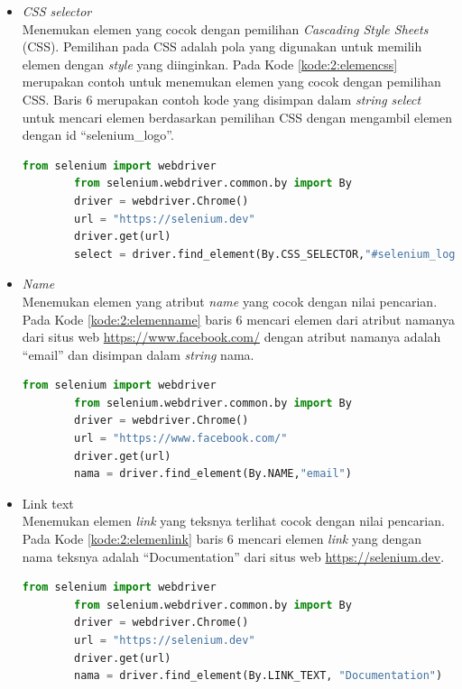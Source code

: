 \begin{itemize}
	\item \textit{CSS selector}\\
	Menemukan elemen yang cocok dengan pemilihan \textit{Cascading Style Sheets} (CSS). Pemilihan pada CSS adalah pola yang digunakan untuk memilih elemen dengan \textit{style} yang diinginkan. Pada Kode \ref{kode:2:elemencss} merupakan contoh untuk menemukan elemen yang cocok dengan pemilihan CSS. Baris 6 merupakan contoh kode yang disimpan dalam \textit{string} \textit{select} untuk mencari elemen berdasarkan pemilihan CSS dengan mengambil elemen dengan id ``selenium\_logo''.
	\begin{lstlisting}[language=python, caption=Contoh kode untuk menemukan elemen dengan \textit{CSS selector}, label=kode:2:elemencss]
		from selenium import webdriver
		from selenium.webdriver.common.by import By
		driver = webdriver.Chrome()
		url = "https://selenium.dev"
		driver.get(url)
		select = driver.find_element(By.CSS_SELECTOR,"#selenium_logo")
	\end{lstlisting}

	\item \textit{Name}\\
	Menemukan elemen yang atribut \textit{name} yang cocok dengan nilai pencarian. Pada Kode \ref{kode:2:elemenname} baris 6 mencari elemen dari atribut namanya dari situs web \url{https://www.facebook.com/} dengan atribut namanya adalah ``email'' dan disimpan dalam \textit{string} nama.
	\begin{lstlisting}[language=python, caption=Contoh kode untuk menemukan elemen dengan atribut nama, label=kode:2:elemenname]
		from selenium import webdriver
		from selenium.webdriver.common.by import By
		driver = webdriver.Chrome()
		url = "https://www.facebook.com/"
		driver.get(url)
		nama = driver.find_element(By.NAME,"email")
	\end{lstlisting}

	\item Link text\\
	Menemukan elemen \textit{link} yang teksnya terlihat cocok dengan nilai pencarian. Pada Kode \ref{kode:2:elemenlink} baris 6 mencari elemen \textit{link} yang dengan nama teksnya adalah ``Documentation'' dari situs web \url{https://selenium.dev}.
	\begin{lstlisting}[language=python, caption=Contoh kode untuk menemukan elemen dengan \textit{link text}, label=kode:2:elemenlink]
		from selenium import webdriver
		from selenium.webdriver.common.by import By
		driver = webdriver.Chrome()
		url = "https://selenium.dev"
		driver.get(url)
		nama = driver.find_element(By.LINK_TEXT, "Documentation")
	\end{lstlisting}


\end{itemize}
